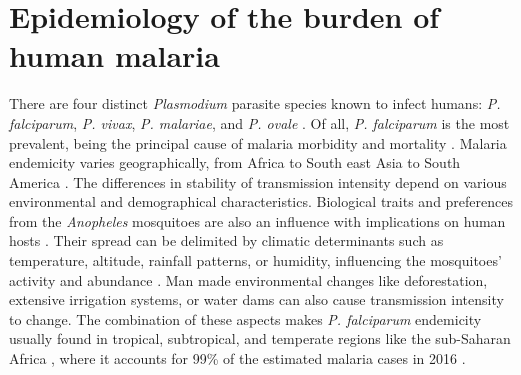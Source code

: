 \section{Epidemiology of the burden of human malaria}
\label{seq:malaria.intro}
There are four distinct \textit{Plasmodium} parasite species known to infect humans: \textit{P. falciparum}, \textit{P. vivax}, \textit{P. malariae}, and \textit{P. ovale} \cite{who2017world}.
Of all, \textit{P. falciparum} is the most prevalent, being the principal cause of malaria morbidity and mortality \cite{perlmann2002malaria}.
Malaria endemicity varies geographically, from Africa to South east Asia to South America \cite{who2017world}.
The differences in stability of transmission intensity depend on various environmental and demographical characteristics.
Biological traits and preferences from the \textit{Anopheles} mosquitoes are also an influence with implications on human hosts \cite{carter2002evolutionary, snow2002consequences}.
Their spread can be delimited by climatic determinants such as temperature, altitude, rainfall patterns, or humidity, influencing the mosquitoes' activity and abundance \cite{warrell2002essential}.
Man made environmental changes like deforestation, extensive irrigation systems, or water dams can also cause transmission intensity to change.
The combination of these aspects makes \textit{P. falciparum} endemicity usually found in tropical, subtropical, and temperate regions like the sub-Saharan Africa \cite{warrell2002essential}, where it accounts for 99\% of the estimated malaria cases in 2016 \cite{who2017world, who2017framework}.


